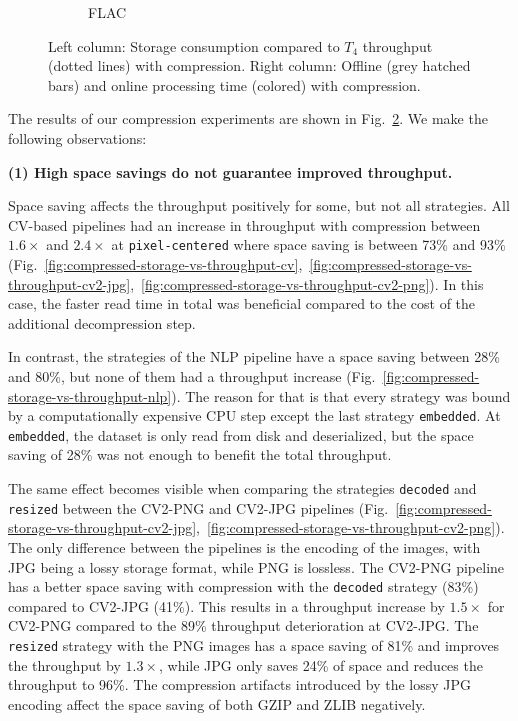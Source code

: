 {\begin{figure}
\begin{subfigure}[c]{0.21\textwidth}
        \vspace{-18pt}
        \caption{FLAC}
        \label{fig:compressed-processing-time-flac}
    \end{subfigure}
    \vspace{-0.3cm}
    \caption{{\color{diff}Left column: Storage consumption compared to $T_4$ throughput (dotted lines) with compression. Right column: Offline (grey hatched bars) and online processing time (colored) with compression.}}
    \label{fig:compression-results}
\end{figure}
The results of our compression experiments are shown in Fig.~\ref{fig:compression-results}.
We make the following observations:

\textbf{(1) High space savings do not guarantee improved throughput.}

Space saving affects the throughput positively for some, but not all strategies.
All CV-based pipelines had an increase in throughput with compression between $1.6\times$ and $2.4\times$ at \texttt{pixel-centered} where space saving is between 73\% and 93\% (Fig.~\ref{fig:compressed-storage-vs-throughput-cv},~\ref{fig:compressed-storage-vs-throughput-cv2-jpg},~\ref{fig:compressed-storage-vs-throughput-cv2-png}).
In this case, the faster read time in total was beneficial compared to the cost of the additional decompression step.

In contrast, the strategies of the NLP pipeline have a space saving between 28\% and 80\%, but none of them had a throughput increase (Fig.~\ref{fig:compressed-storage-vs-throughput-nlp}).
The reason for that is that every strategy was bound by a computationally expensive CPU step except the last strategy \texttt{embedded}.
At \texttt{embedded}, the dataset is only read from disk and deserialized, but the space saving of 28\% was not enough to benefit the total throughput.

The same effect becomes visible when comparing the strategies \texttt{decoded} and \texttt{resized} between the CV2-PNG and CV2-JPG pipelines (Fig.~\ref{fig:compressed-storage-vs-throughput-cv2-jpg},~\ref{fig:compressed-storage-vs-throughput-cv2-png}).
The only difference between the pipelines is the encoding of the images, with JPG being a lossy storage format, while PNG is lossless.
The CV2-PNG pipeline has a better space saving with compression with the \texttt{decoded} strategy (83\%) compared to CV2-JPG (41\%).
This results in a throughput increase by $1.5\times$ for CV2-PNG compared to the 89\% throughput deterioration at CV2-JPG.
The \texttt{resized} strategy with the PNG images has a space saving of 81\% and improves the throughput by $1.3\times$, while JPG only saves 24\% of space and reduces the throughput to 96\%.
The compression artifacts introduced by the lossy JPG encoding affect the space saving of both GZIP and ZLIB negatively.

}
